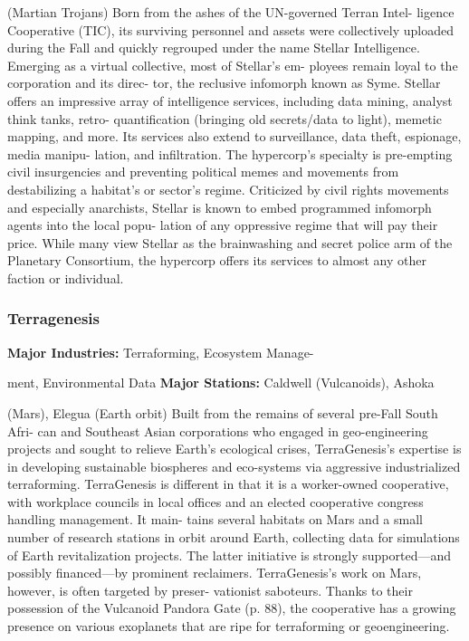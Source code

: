 (Martian Trojans)
Born from the ashes of the UN-governed Terran Intel-
ligence Cooperative (TIC), its surviving personnel and 
assets were collectively uploaded during the Fall and 
quickly regrouped under the name Stellar Intelligence. 
Emerging as a virtual collective, most of Stellar's em-
ployees remain loyal to the corporation and its direc-
tor, the reclusive infomorph known as Syme. Stellar 
offers an impressive array of intelligence services, 
including data mining, analyst think tanks, retro-
quantification (bringing old secrets/data to light), 
memetic mapping, and more. Its services also extend 
to surveillance, data theft, espionage, media manipu-
lation, and infiltration. The hypercorp's specialty is 
pre-empting civil insurgencies and preventing political 
memes and movements from destabilizing a habitat's 
or sector's regime. Criticized by civil rights movements 
and especially anarchists, Stellar is known to embed 
programmed infomorph agents into the local popu-
lation of any oppressive regime that will pay their 
price. While many view Stellar as the brainwashing 
and secret police arm of the Planetary Consortium, 
the hypercorp offers its services to almost any other 
faction or individual.

\subsubsection{Terragenesis}

\textbf{Major Industries:} Terraforming, Ecosystem Manage-

ment, Environmental Data
\textbf{Major Stations:} Caldwell (Vulcanoids), Ashoka 

(Mars), Elegua (Earth orbit)
Built from the remains of several pre-Fall South Afri-
can and Southeast Asian corporations who engaged 
in geo-engineering projects and sought to relieve 
Earth's ecological crises, TerraGenesis's expertise is in 
developing sustainable biospheres and eco-systems via 
aggressive industrialized terraforming. TerraGenesis 
is different in that it is a worker-owned cooperative, 
with workplace councils in local offices and an elected 
cooperative congress handling management. It main-
tains several habitats on Mars and a small number of 
research stations in orbit around Earth, collecting data 
for simulations of Earth revitalization projects. The 
latter initiative is strongly supported—and possibly 
financed—by prominent reclaimers. TerraGenesis's 
work on Mars, however, is often targeted by preser-
vationist saboteurs. Thanks to their possession of the 
Vulcanoid Pandora Gate (p. 88), the cooperative has a 
growing presence on various exoplanets that are ripe 
for terraforming or geoengineering.

